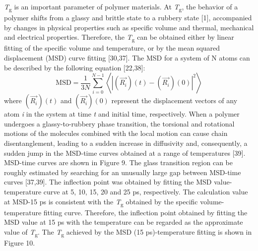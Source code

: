 \documentclass{article}
\begin{document}
\emph{T}\textsubscript{g} is an important parameter of polymer materials. At \emph{T}\textsubscript{g}, the behavior of a polymer shifts from a glassy and brittle state to a rubbery state [1], accompanied by changes in physical properties such as specific volume and thermal, mechanical and electrical properties. Therefore, the \emph{T}\textsubscript{g} can be obtained either by linear fitting of the specific volume and temperature, or by the mean squared displacement (MSD) curve fitting [30,37]. The MSD for a system of N atoms can be described by the following equation [22,38]:
\begin{equation}
\mathrm{MSD} = \frac{1}{3N}\sum_{i=0}^{N-1}\left\langle\left|\left(\overrightarrow{R_i}\right)(t) - \left(\overrightarrow{R_i}\right)(0)\right|^2\right\rangle
\tag{5}
\end{equation}
where $\left(\overrightarrow{R_i}\right)(t)$ and $\left(\overrightarrow{R_i}\right)(0)$ represent the displacement vectors of any atom \emph{i} in the system at time \emph{t} and initial time, respectively. When a polymer undergoes a glassy-to-rubbery phase transition, the torsional and rotational motions of the molecules combined with the local motion can cause chain disentanglement, leading to a sudden increase in diffusivity and, consequently, a sudden jump in the MSD-time curves obtained at a range of temperatures [39]. MSD-time curves are shown in Figure 9. The glass transition region can be roughly estimated by searching for an unusually large gap between MSD-time curves [37,39]. The inflection point was obtained by fitting the MSD value-temperature curve at 5, 10, 15, 20 and 25 ps, respectively. The calculation value at MSD-15 ps is consistent with the \emph{T}\textsubscript{g} obtained by the specific volume-temperature fitting curve. Therefore, the inflection point obtained by fitting the MSD value at 15 ps with the temperature can be regarded as the approximate value of \emph{T}\textsubscript{g}. The \emph{T}\textsubscript{g} achieved by the MSD (15 ps)-temperature fitting is shown in Figure 10.
\end{document}
